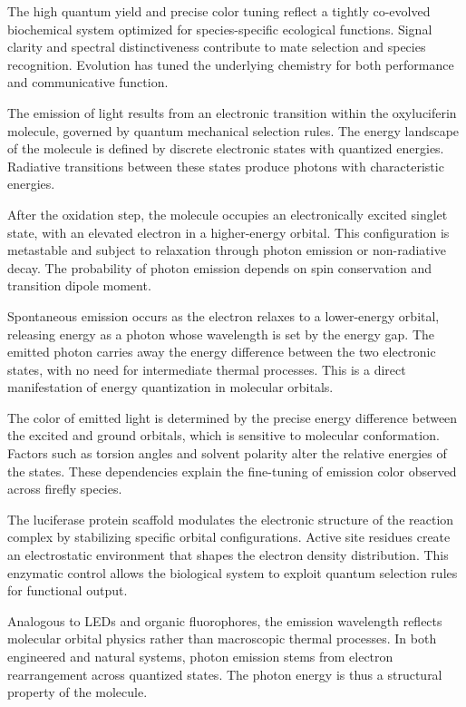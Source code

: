 The high quantum yield and precise color tuning reflect a tightly co-evolved biochemical system optimized for species-specific ecological functions. Signal clarity and spectral distinctiveness contribute to mate selection and species recognition. Evolution has tuned the underlying chemistry for both performance and communicative function.

The emission of light results from an electronic transition within the oxyluciferin molecule, governed by quantum mechanical selection rules. The energy landscape of the molecule is defined by discrete electronic states with quantized energies. Radiative transitions between these states produce photons with characteristic energies.

After the oxidation step, the molecule occupies an electronically excited singlet state, with an elevated electron in a higher-energy orbital. This configuration is metastable and subject to relaxation through photon emission or non-radiative decay. The probability of photon emission depends on spin conservation and transition dipole moment.

Spontaneous emission occurs as the electron relaxes to a lower-energy orbital, releasing energy as a photon whose wavelength is set by the energy gap. The emitted photon carries away the energy difference between the two electronic states, with no need for intermediate thermal processes. This is a direct manifestation of energy quantization in molecular orbitals.

The color of emitted light is determined by the precise energy difference between the excited and ground orbitals, which is sensitive to molecular conformation. Factors such as torsion angles and solvent polarity alter the relative energies of the states. These dependencies explain the fine-tuning of emission color observed across firefly species.

The luciferase protein scaffold modulates the electronic structure of the reaction complex by stabilizing specific orbital configurations. Active site residues create an electrostatic environment that shapes the electron density distribution. This enzymatic control allows the biological system to exploit quantum selection rules for functional output.

Analogous to LEDs and organic fluorophores, the emission wavelength reflects molecular orbital physics rather than macroscopic thermal processes. In both engineered and natural systems, photon emission stems from electron rearrangement across quantized states. The photon energy is thus a structural property of the molecule.

